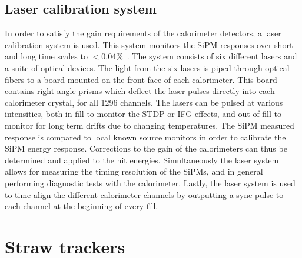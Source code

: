 


\subsection{Laser calibration system}
\label{sub:LaserCalibrationSystem}


In order to satisfy the gain requirements of the calorimeter detectors, a laser calibration system is used. This system monitors the SiPM responses over short and long time scales to $< 0.04\%$~\cite{Anastasi:2017sos}. The system consists of six different lasers and a suite of optical devices. The light from the six lasers is piped through optical fibers to a board mounted on the front face of each calorimeter. This board contains right-angle prisms which deflect the laser pulses directly into each calorimeter crystal, for all 1296 channels. The lasers can be pulsed at various intensities, both in-fill to monitor the STDP or IFG effects, and out-of-fill to monitor for long term drifts due to changing temperatures. The SiPM measured response is compared to local known source monitors in order to calibrate the SiPM energy response. Corrections to the gain of the calorimeters can thus be determined and applied to the hit energies. Simultaneously the laser system allows for measuring the timing resolution of the SiPMs, and in general performing diagnostic tests with the calorimeter. Lastly, the laser system is used to time align the different calorimeter channels by outputting a sync pulse to each channel at the beginning of every fill.






\section{Straw trackers}
\label{sec:StrawTrackers}

